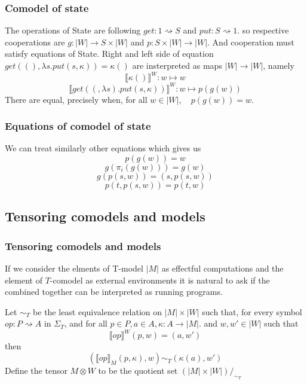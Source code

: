 \documentclass{beamer}
\begin{document}
\begin{frame}
    \frametitle{Comodel of state}
    The operations of State are following $get : 1 \rightsquigarrow S$ and $put: S \rightsquigarrow 1$.
    so respective cooperations are $g: |W| \rightarrow S \times |W|$ and $p : S \times |W| \rightarrow |W|$.
    And cooperation must satisfy equations of State.
    Right and left side of equation $get((), \lambda s . put(s, \kappa)) = \kappa ()$  are 
    insterpreted as maps $|W| \rightarrow |W|$, namely 
    \[
      \llbracket \kappa () \rrbracket^W : w \mapsto w
    \]
    \[
      \llbracket get((, \lambda s). put(s, \kappa)) \rrbracket^W : w \mapsto p(g(w))   
    \]
    There are equal, precisely when, for all $w \in |W|, \quad p(g(w)) = w$.
    
 

\end{frame}
\begin{frame}
    \frametitle{Equations of comodel of state}
    We can treat similarly other equations which gives us 
    \[
        p(g(w)) = w
    \]
    \[
      g(\pi_i(g(w))) = g(w)  
    \]
    \[
        g(p(s,w)) = (s, p(s,w))
    \]
    \[
      p(t, p(s,w)) = p(t, w)  
    \]

    

\end{frame}

\subsection{Tensoring comodels and models}

\begin{frame}
    \frametitle{Tensoring comodels and models}
    If we consider the elments of T-model $|M|$ as effectful computations and the element of $T$-comodel as 
    external environments it is natural to ask if the combined together can be interpreted as running programs.
    
    Let $\sim_T$ be the least equivalence relation on $|M| \times |W|$
    such that, for every symbol $op : P \rightsquigarrow A$ in $\Sigma_T$, 
    and for all $p \in P, a \in A, \kappa : A \rightarrow |M|$. and $w, w' \in |W|$ 
    such that    \[
        \llbracket op \rrbracket^W    (p, w) = (a, w')
    \] then 
    \[
        (\llbracket op\rrbracket_M (p,\kappa), w)   \sim_T (\kappa(a), w')
    \]
    Define the tensor $M \otimes W$ to be the quotient set $(|M| \times |W|)/_{\sim_T}$
    
    
    

\end{frame}
\end{document}
